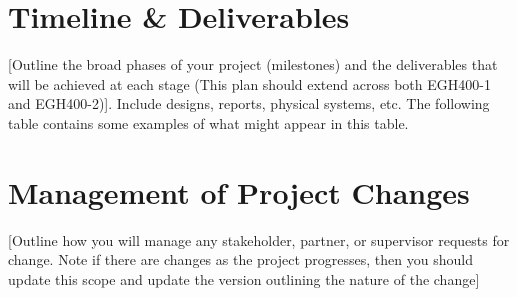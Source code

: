 \documentclass[11pt]{article}
\begin{document}
\section{Timeline \& Deliverables}
[Outline the broad phases of your project (milestones) and the deliverables that will be achieved at
each stage (This plan should extend across both EGH400-1 and EGH400-2)]. Include designs, reports,
physical systems, etc. The following table contains some examples of what might appear in this table.



\section{Management of Project Changes}
[Outline how you will manage any stakeholder, partner, or supervisor requests for change. Note if
there are changes as the project progresses, then you should update this scope and update the
version outlining the nature of the change]
\end{document}
